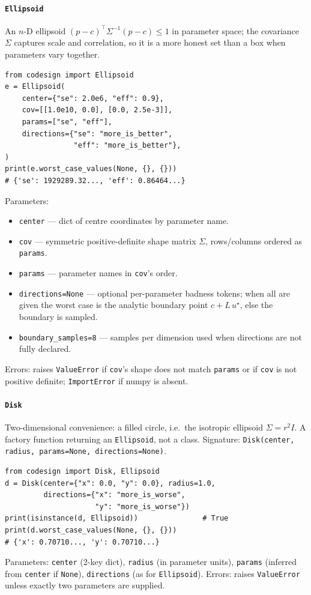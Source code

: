 \documentclass[11pt,a4paper]{article}
\begin{document}
\paragraph{\texttt{Ellipsoid}}\label{ref:uncertainty:ellipsoid}
An $n$-D ellipsoid $(p-c)^\top \Sigma^{-1}(p-c) \leq 1$ in parameter space;
the covariance $\Sigma$ captures scale and correlation, so it is a more
honest set than a box when parameters vary together.
\begin{lstlisting}
from codesign import Ellipsoid
e = Ellipsoid(
    center={"se": 2.0e6, "eff": 0.9},
    cov=[[1.0e10, 0.0], [0.0, 2.5e-3]],
    params=["se", "eff"],
    directions={"se": "more_is_better",
                "eff": "more_is_better"},
)
print(e.worst_case_values(None, {}, {}))
# {'se': 1929289.32..., 'eff': 0.86464...}
\end{lstlisting}
Parameters:
\begin{itemize}[nosep]
  \item \texttt{center} --- dict of centre coordinates by parameter name.
  \item \texttt{cov} --- symmetric positive-definite shape matrix $\Sigma$,
    rows/columns ordered as \texttt{params}.
  \item \texttt{params} --- parameter names in \texttt{cov}'s order.
  \item \texttt{directions=None} --- optional per-parameter badness tokens;
    when all are given the worst case is the analytic boundary point
    $c + L\,u^\star$, else the boundary is sampled.
  \item \texttt{boundary\_samples=8} --- samples per dimension used when
    directions are not fully declared.
\end{itemize}
Errors: raises \texttt{ValueError} if \texttt{cov}'s shape does not match
\texttt{params} or if \texttt{cov} is not positive definite;
\texttt{ImportError} if numpy is absent.

\paragraph{\texttt{Disk}}\label{ref:uncertainty:disk}
Two-dimensional convenience: a filled circle, i.e.\ the isotropic ellipsoid
$\Sigma = r^2 I$. A factory function returning an \texttt{Ellipsoid}, not a
class.
Signature: \texttt{Disk(center, radius, params=None, directions=None)}.
\begin{lstlisting}
from codesign import Disk, Ellipsoid
d = Disk(center={"x": 0.0, "y": 0.0}, radius=1.0,
         directions={"x": "more_is_worse",
                     "y": "more_is_worse"})
print(isinstance(d, Ellipsoid))               # True
print(d.worst_case_values(None, {}, {}))
# {'x': 0.70710..., 'y': 0.70710...}
\end{lstlisting}
Parameters: \texttt{center} (2-key dict), \texttt{radius} (in parameter
units), \texttt{params} (inferred from \texttt{center} if \texttt{None}),
\texttt{directions} (as for \texttt{Ellipsoid}). Errors: raises
\texttt{ValueError} unless exactly two parameters are supplied.
\end{document}
